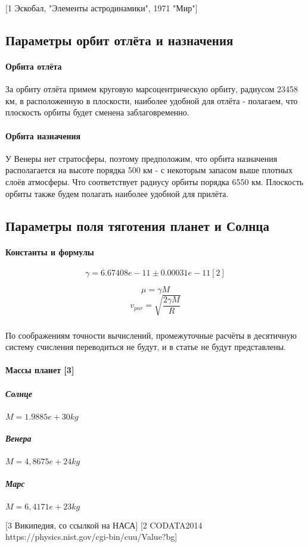 [1 Эскобал, "Элементы астродинамики", 1971 "Мир"]

\subsection{Параметры орбит отлёта и назначения}
\paragraph{Орбита отлёта}
За орбиту отлёта примем круговую марсоцентрическую орбиту, радиусом 23458 км, в расположенную в плоскости, наиболее удобной для отлёта - полагаем, что плоскость орбиты будет сменена заблаговременно.

\paragraph{Орбита назначения}
У Венеры нет стратосферы, поэтому предположим, что орбита назначения располагается на высоте порядка 500 км - с некоторым запасом выше плотных слоёв атмосферы. Что соответствует радиусу орбиты порядка 6550 км. Плоскость орбиты также будем полагать наиболее удобной для прилёта.

\subsection{Параметры поля тяготения планет и Солнца}
\paragraph{Константы и формулы}
$$\gamma = 6.67408e-11 \pm 0.00031e-11 [2]$$

$$\mu = \gamma M$$
$$v_{par} = \sqrt{\frac{2\gamma M}{R}}$$
\subparagraph{}По соображениям точности вычислений, промежуточные расчёты в десятичную систему счисления переводиться не будут, и в статье не будут представлены.

\paragraph{Массы планет [3]}
\subparagraph{Солнце} $M = 1.9885e+30 kg$
\subparagraph{Венера} $M = 4,8675e+24 kg$
\subparagraph{Марс} $M = 6,4171e+23 kg$

[3 Википедия, со ссылкой на НАСА]
[2 CODATA2014 https://physics.nist.gov/cgi-bin/cuu/Value?bg]